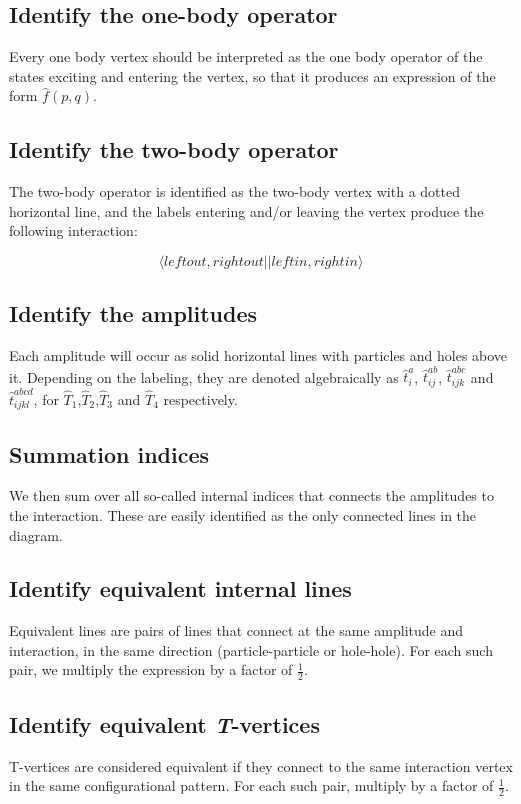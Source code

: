 \subsection{Identify the one-body operator}
Every one body vertex should be interpreted as the one body operator of the states exciting and entering the vertex, so that it produces an expression of the form $\hat{f}(p,q)$.

\subsection{Identify the two-body operator}
The two-body operator is identified as the two-body vertex with a dotted horizontal line, and the labels entering and/or leaving the vertex produce the following interaction:

\begin{equation}
\langle left out, right out \vert \vert left in, right in \rangle
\end{equation}

\subsection{Identify the amplitudes}
Each amplitude will occur as solid horizontal lines with particles and holes above it. Depending on the labeling, they are denoted algebraically as $\hat{t}^a_i$, $\hat{t}^{ab}_{ij}$, $\hat{t}^{abc}_{ijk}$ and $\hat{t}^{abcd}_{ijkl}$, for $\hat{T}_1$,$\hat{T}_2$,$\hat{T}_3$ and $\hat{T}_4$ respectively.

\subsection{Summation indices}
We then sum over all so-called internal indices that connects the amplitudes to the interaction. These are easily identified as the only connected lines in the diagram.

\subsection{Identify equivalent internal lines}
Equivalent lines are pairs of lines that connect at the same amplitude and interaction, in the same direction (particle-particle or hole-hole). For each such pair, we multiply the expression by a factor of $\frac{1}{2}$.

\subsection{Identify equivalent \emph{T}-vertices}
T-vertices are considered equivalent if they connect to the same interaction vertex in the same configurational pattern. For each such pair, multiply by a factor of $\frac{1}{2}$.

